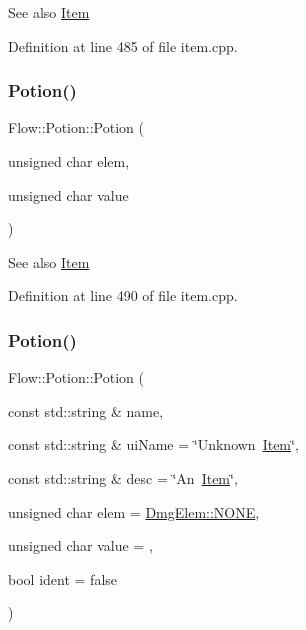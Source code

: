 \begin{DoxySeeAlso}{See also}
\hyperlink{class_flow_1_1_item}{Item} 
\end{DoxySeeAlso}


Definition at line 485 of file item.\+cpp.

\hypertarget{class_flow_1_1_potion_acbe254ee9f64b11f23fb75e2486d4dbe}{}\label{class_flow_1_1_potion_acbe254ee9f64b11f23fb75e2486d4dbe} 
\subsubsection{\texorpdfstring{Potion()}{Potion()}\hspace{0.1cm}{\footnotesize\ttfamily [3/4]}}
{\footnotesize\ttfamily Flow\+::\+Potion\+::\+Potion (\begin{DoxyParamCaption}\item[{unsigned char}]{elem,  }\item[{unsigned char}]{value }\end{DoxyParamCaption})}

\begin{DoxySeeAlso}{See also}
\hyperlink{class_flow_1_1_item}{Item} 
\end{DoxySeeAlso}


Definition at line 490 of file item.\+cpp.

\hypertarget{class_flow_1_1_potion_a2ed91ff209bdb8d665a65005f714453d}{}\label{class_flow_1_1_potion_a2ed91ff209bdb8d665a65005f714453d} 
\subsubsection{\texorpdfstring{Potion()}{Potion()}\hspace{0.1cm}{\footnotesize\ttfamily [4/4]}}
{\footnotesize\ttfamily Flow\+::\+Potion\+::\+Potion (\begin{DoxyParamCaption}\item[{const std\+::string \&}]{name,  }\item[{const std\+::string \&}]{ui\+Name = {\ttfamily \char`\"{}Unknown~\hyperlink{class_flow_1_1_item}{Item}\char`\"{}},  }\item[{const std\+::string \&}]{desc = {\ttfamily \char`\"{}An~\hyperlink{class_flow_1_1_item}{Item}\char`\"{}},  }\item[{unsigned char}]{elem = {\ttfamily \hyperlink{namespace_flow_1_1_dmg_elem_a2c7180f371963927ddcc5b333568a33b}{Dmg\+Elem\+::\+N\+O\+NE}},  }\item[{unsigned char}]{value = {},  }\item[{bool}]{ident = {\ttfamily false} }\end{DoxyParamCaption})}

